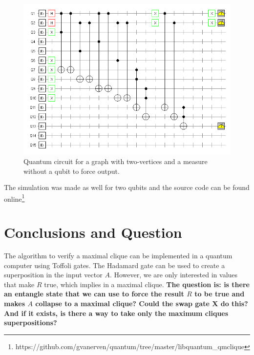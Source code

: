 \documentclass[a4paper,12pt]{article}
\begin{document}
\begin{figure}[!ht]
	\label{fig:qcircuitnctr}
	\centering
	\includegraphics[width=1\textwidth]{qcliquencontr}
	\caption{Quantum circuit for a graph with two-vertices and a measure without a qubit to force output.}
\end{figure}

The simulation was made as well for two qubits and the source code can be found online\footnote{https://github.com/gvanerven/quantum/tree/master/libquantum\_qmclique}

\pagebreak
\section{Conclusions and Question}

The algorithm to verify a maximal clique can be implemented in a quantum computer using Toffoli gates. The Hadamard gate can be used to create a superposition in the input vector $A$. However, we are only interested in values that make $R$ true, which implies in a maximal clique. \textbf{The question is: is there an entangle state that we can use to force the result $R$ to be true and makes $A$ collapse to a maximal clique? Could the swap gate X do this? And if it exists, is there a way to take only the maximum cliques superpositions?}
\end{document}
